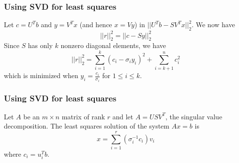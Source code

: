 \documentclass[10pt]{beamer}
\begin{document}
\begin{frame}
\frametitle{Using SVD for least squares}
 Let $c = U^Tb$ and $y = V^Tx$ (and hence $x=Vy$) in $||U^Tb-SV^Tx||^2_2.$  We now have $$||r||^2_2 = ||c-Sy||^2_2$$  Since $S$ has only $k$ nonzero diagonal elements, we have $$||r||^2_2 = \sum_{i=1}^k (c_i-\sigma_i y_i)^2 + \sum_{i=k+1}^n c_i^2$$ which is minimized when $y_i = \frac{c_i}{\sigma_i}$ for $1\leq i \leq k$.

\end{frame}
\begin{frame}
\frametitle{Using SVD for least squares}
\begin{theorem}
Let $A$ be an $m \times n$ matrix of rank $r$ and let $A = USV^T$, 
the singular value decomposition.  
The least squares solution of the system $Ax=b$ is 
$$x = \sum_{i=1}^r(\sigma^{-1}_ic_i)v_i$$ where $c_i = u_i^Tb.$ 
\end{theorem}
\end{frame}
\end{document}
